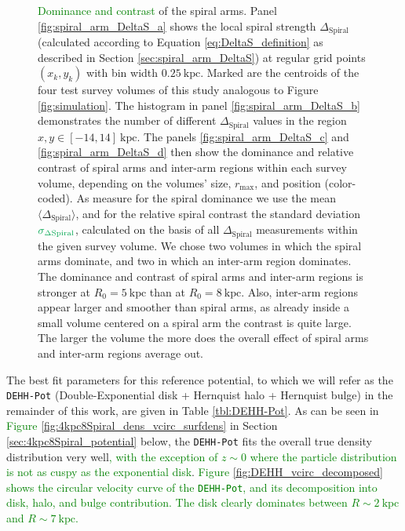 \documentclass[iop,revtex4,numberedappendix,appendixfloats]{emulateapj}
\newcommand{\NEW}[1]{\textcolor{Green}{#1}}
\newcommand{\OLD}[1]{}
\begin{document}
\begin{figure}[!htbp]
\caption{\OLD{Contrast and dominance}\NEW{Dominance and contrast} of the spiral arms. Panel \ref{fig:spiral_arm_DeltaS_a} shows the local spiral strength $\Delta_{\text{Spiral}\OLD{,k}}$ (calculated according to Equation \eqref{eq:DeltaS_definition} as described in Section \ref{sec:spiral_arm_DeltaS}) at regular grid points $(x_k,y_k)$ with bin width $0.25~\text{kpc}$. Marked are the centroids of the four test survey volumes of this study analogous to Figure \ref{fig:simulation}. The histogram in panel \ref{fig:spiral_arm_DeltaS_b} demonstrates the number of different $\Delta_\text{Spiral}$ values in the region $x,y \in [-14,14]~\text{kpc}$. The panels \ref{fig:spiral_arm_DeltaS_c} and \ref{fig:spiral_arm_DeltaS_d} then show the dominance and relative  contrast of spiral arms and inter-arm regions within each survey volume, depending on the volumes' size, $r_\text{max}$, and position (color-coded\OLD{ according to panel \ref{fig:spiral_arm_DeltaS_a}}). As measure for the spiral dominance we use the mean $\langle \Delta_\text{Spiral} \OLD{(r \leq r_\text{max})} \rangle$, and for the relative spiral contrast the standard deviation $\OLD{\sigma[\Delta_\text{Spiral} (r \leq r_\text{max})]}\NEW{\sigma_{\Delta\text{Spiral}}}$, calculated on the basis of all $\Delta_{\text{Spiral}\OLD{,k}}$ measurements within the given survey volume. We chose two volumes in which the spiral arms dominate, and two in which an inter-arm region dominates. The dominance and contrast of spiral arms and inter-arm regions is stronger at $R_0=5~\text{kpc}$ than at $R_0=8~\text{kpc}$. Also, inter-arm regions appear larger and smoother than spiral arms, as already inside a small volume centered on a spiral arm the contrast is quite large. The larger the volume the more does the overall effect of spiral arms and inter-arm regions average out.}
\label{fig:spiral_arm_DeltaS}
\end{figure}

The best fit parameters for this reference potential, to which we will refer as the \texttt{DEHH-Pot} (Double-Exponential disk + Hernquist halo + Hernquist bulge) in the remainder of this work, are given in Table \ref{tbl:DEHH-Pot}. As can be seen in \OLD{Figures \ref{fig:4kpc8Spiral_density} and \ref{fig:4kpc8Spiral_vcirc_surfdens}}\NEW{Figure \ref{fig:4kpc8Spiral_dens_vcirc_surfdens}} in Section \ref{sec:4kpc8Spiral_potential} below, the \texttt{DEHH-Pot} fits the overall true density distribution very well\NEW{, with the exception of $z\sim0$ where the particle distribution is not as cuspy as the exponential disk}. \OLD{Its density profile might be a little steeper around $z\sim 0$ than the actual particle distribution, but this should not affect the overall discussion, as the radial density, surface density and disk-to-halo ratio profiles are so well reproduced.} \NEW{Figure \ref{fig:DEHH_vcirc_decomposed} shows the circular velocity curve of the \texttt{DEHH-Pot}, and its decomposition into disk, halo, and bulge contribution. The disk clearly dominates between $R\sim2~\text{kpc}$ and $R\sim7~\text{kpc}$.}
\end{document}
